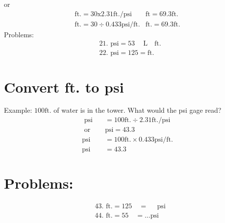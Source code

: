 \documentclass[10pt]{article}
\begin{document}
or
$$
\begin{array}{ll}
\mathrm{ft} .=30 \mathrm{x} 2.31 \mathrm{ft} . / \mathrm{psi} & \mathrm{ft}=69.3 \mathrm{ft} . \\
\mathrm{ft} .=30 \div 0.433 \mathrm{psi} / \mathrm{ft} . & \mathrm{ft} .=69.3 \mathrm{ft} .
\end{array}
$$
Problems:
$$
\begin{aligned}
& \text { 21. } \mathrm{psi}=53 \quad \mathrm{~L} \quad \mathrm{ft} \text {. } \\
& \text { 22. } \mathrm{psi}=125=\mathrm{ft} \text {. }
\end{aligned}
$$

\section{Convert ft. to psi}
Example: $100 \mathrm{ft}$. of water is in the tower. What would the psi gage read?
$$
\begin{array}{ll}
\text { psi } & =100 \mathrm{ft} . \div 2.31 \mathrm{ft} . / \mathrm{psi} \\
\text { or } \quad & \mathrm{psi}=43.3 \\
\mathrm{psi} & =100 \mathrm{ft} . \times 0.433 \mathrm{psi} / \mathrm{ft} . \\
\mathrm{psi} & =43.3
\end{array}
$$

\section{Problems:}
$$
\begin{aligned}
& \text { 43. } \mathrm{ft} .=125 \quad=\quad \text { psi } \\
& \text { 44. } \mathrm{ft} .=55 \quad=\ldots \mathrm{psi}
\end{aligned}
$$
\end{document}
